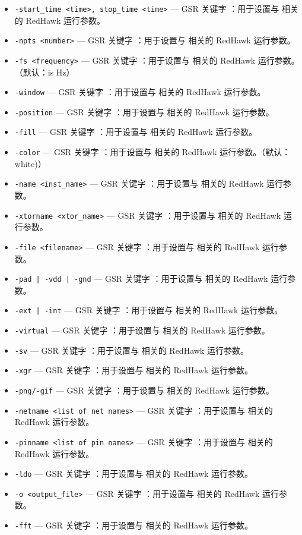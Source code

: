 \begin{itemize}
\item \texttt{-start\_time <time>, stop\_time <time>} — GSR 关键字 ：用于设置与  相关的 RedHawk 运行参数。
\item \texttt{-npts <number>} — GSR 关键字 ：用于设置与  相关的 RedHawk 运行参数。
\item \texttt{-fs <frequency>} — GSR 关键字 ：用于设置与  相关的 RedHawk 运行参数。（默认：is Hz）
\item \texttt{-window} — GSR 关键字 ：用于设置与  相关的 RedHawk 运行参数。
\item \texttt{-position} — GSR 关键字 ：用于设置与  相关的 RedHawk 运行参数。
\item \texttt{-fill} — GSR 关键字 ：用于设置与  相关的 RedHawk 运行参数。
\item \texttt{-color} — GSR 关键字 ：用于设置与  相关的 RedHawk 运行参数。（默认：white)）
\item \texttt{-name <inst\_name>} — GSR 关键字 ：用于设置与  相关的 RedHawk 运行参数。
\item \texttt{-xtorname <xtor\_name>} — GSR 关键字 ：用于设置与  相关的 RedHawk 运行参数。
\item \texttt{-file <filename>} — GSR 关键字 ：用于设置与  相关的 RedHawk 运行参数。
\item \texttt{-pad | -vdd | -gnd} — GSR 关键字 ：用于设置与  相关的 RedHawk 运行参数。
\item \texttt{-ext | -int} — GSR 关键字 ：用于设置与  相关的 RedHawk 运行参数。
\item \texttt{-virtual} — GSR 关键字 ：用于设置与  相关的 RedHawk 运行参数。
\item \texttt{-sv} — GSR 关键字 ：用于设置与  相关的 RedHawk 运行参数。
\item \texttt{-xgr} — GSR 关键字 ：用于设置与  相关的 RedHawk 运行参数。
\item \texttt{-png/-gif} — GSR 关键字 ：用于设置与  相关的 RedHawk 运行参数。
\item \texttt{-netname <list of net names>} — GSR 关键字 ：用于设置与  相关的 RedHawk 运行参数。
\item \texttt{-pinname <list of pin names>} — GSR 关键字 ：用于设置与  相关的 RedHawk 运行参数。
\item \texttt{-ldo} — GSR 关键字 ：用于设置与  相关的 RedHawk 运行参数。
\item \texttt{-o <output\_file>} — GSR 关键字 ：用于设置与  相关的 RedHawk 运行参数。
\item \texttt{-fft} — GSR 关键字 ：用于设置与  相关的 RedHawk 运行参数。

\end{itemize}
